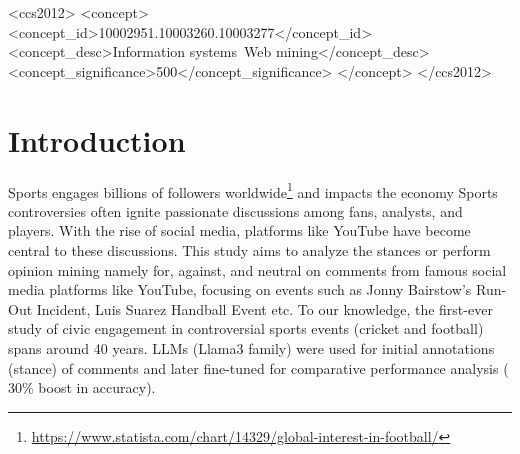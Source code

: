 \documentclass[sigconf, review]{acmart}
\begin{document}
\begin{CCSXML}
<ccs2012>
   <concept>
       <concept_id>10002951.10003260.10003277</concept_id>
       <concept_desc>Information systems~Web mining</concept_desc>
       <concept_significance>500</concept_significance>
       </concept>
 </ccs2012>
\end{CCSXML}



\maketitle

\section{Introduction}
Sports engages billions of followers worldwide\footnote{\url{https://www.statista.com/chart/14329/global-interest-in-football/}} and impacts the economy %
Sports controversies often ignite passionate discussions among fans, analysts, and players. With the rise of social media, platforms like YouTube have become central to these discussions. This study aims to analyze the stances or perform opinion mining namely for, against, and neutral on comments from famous social media platforms like YouTube, focusing on events such as Jonny Bairstow's Run-Out Incident, Luis Suarez Handball Event etc.
To our knowledge, the first-ever study of civic engagement in controversial sports events (cricket and football) spans around 40 years. LLMs (Llama3 family) were used for initial annotations (stance) of comments and later fine-tuned for comparative performance analysis ($~$30\% boost in accuracy).~\cite{Lamport:LaTeX}
\end{document}
